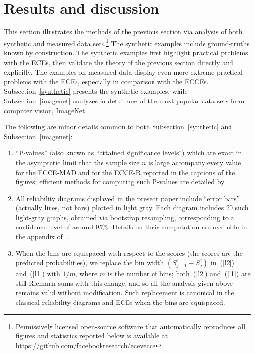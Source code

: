 \documentclass{article}
\begin{document}
\section{Results and discussion}
\label{results}

This section illustrates the methods of the previous section
via analysis of both synthetic
and measured data sets.\footnote{Permissively licensed open-source software
that automatically reproduces all figures and statistics reported below
is available at \url{https://github.com/facebookresearch/ecevecce}}
The synthetic examples include ground-truths known by construction.
The synthetic examples first highlight practical problems with the ECEs,
then validate the theory of the previous section directly and explicitly.
The examples on measured data display even more extreme practical problems
with the ECEs, especially in comparison with the ECCEs.
Subsection~\ref{synthetic} presents the synthetic examples,
while Subsection~\ref{imagenet} analyzes in detail one of the most popular
data sets from computer vision, ImageNet.

The following are minor details common to both Subsection~\ref{synthetic}
and Subsection~\ref{imagenet}:
%
\begin{enumerate}
\item ``P-values'' (also known as ``attained significance levels'')
which are exact in the asymptotic limit that the sample size $n$ is large
accompany every value for the ECCE-MAD and for the ECCE-R
reported in the captions of the figures; efficient methods
for computing such P-values are detailed by~\cite{tygert_pvals}.
\item All reliability diagrams displayed in the present paper include
``error bars'' (actually lines, not bars) plotted in light gray.
Each diagram includes 20 such light-gray graphs,
obtained via bootstrap resampling, corresponding to a confidence level
of around 95\%. Details on their computation are available
in the appendix of~\cite{tygert_full}.
\item When the bins are equispaced with respect to the scores
(the scores are the predicted probabilities), we replace the bin width
$(S_{j+1}^1 - S_j^1)$ in~(\ref{l2}) and~(\ref{l1}) with $1/m$,
where $m$ is the number of bins;
both~(\ref{l2}) and~(\ref{l1}) are still Riemann sums with this change,
and so all the analysis given above remains valid without modification.
Such replacement is canonical in the classical reliability diagrams and ECEs
when the bins are equispaced.
\end{enumerate}
\end{document}
